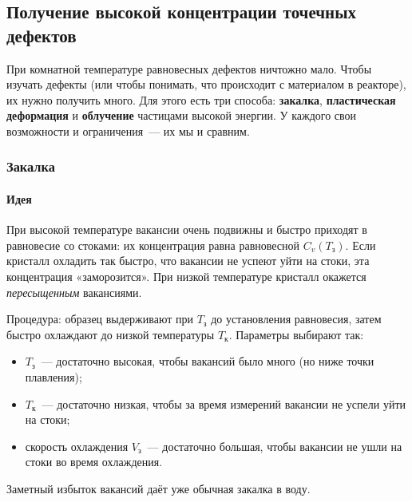 \subsection{Получение высокой концентрации точечных дефектов}\label{ssec:production}

\begin{orientir}
При комнатной температуре равновесных дефектов ничтожно мало. Чтобы
изучать дефекты (или чтобы понимать, что происходит с материалом в
реакторе), их нужно получить много. Для этого есть три способа:
\textbf{закалка}, \textbf{пластическая деформация} и \textbf{облучение}
частицами высокой энергии. У каждого свои возможности и ограничения~— их
мы и сравним.
\end{orientir}

\subsubsection{Закалка}

\paragraph{Идея}
При высокой температуре вакансии очень подвижны и быстро приходят в
равновесие со стоками: их концентрация равна равновесной
$C_v(T_{\text{з}})$. Если кристалл охладить так быстро, что вакансии не
успеют уйти на стоки, эта концентрация «заморозится». При низкой
температуре кристалл окажется \emph{пересыщенным} вакансиями.

Процедура: образец выдерживают при 
$T_{\text{з}}$ до установления равновесия, затем быстро охлаждают до
низкой температуры $T_{\text{к}}$. Параметры выбирают так:
\begin{itemize}
\item $T_{\text{з}}$~— достаточно высокая, чтобы вакансий было много
(но ниже точки плавления);
\item $T_{\text{к}}$~— достаточно низкая, чтобы за время измерений
вакансии не успели уйти на стоки;
\item скорость охлаждения $V_{\text{з}}$~— достаточно большая, чтобы
вакансии не ушли на стоки во время охлаждения.
\end{itemize}
Заметный избыток вакансий даёт уже обычная закалка в воду.

